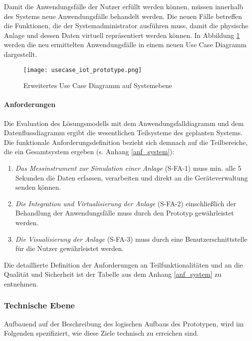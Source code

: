 Damit die Anwendungsfälle der Nutzer erfüllt werden können, müssen innerhalb des Systems neue Anwendungsfälle behandelt werden. Die neuen Fälle betreffen die Funktionen, die der Systemadministrator ausführen muss, damit die physische Anlage und dessen Daten virtuell repräsentiert werden können. In Abbildung \ref{usecasediagram} werden die neu ermittelten Anwendungsfälle in einem neuen Use Case Diagramm dargestellt.

\begin{figure}[ht!]
  \centering
  \texttt{[image: usecase\_iot\_prototype.png]}
  \caption[Erweitertes Use Case Diagramm auf Systemebene]{Erweitertes Use Case Diagramm auf Systemebene}
  \label{usecasediagram}
\end{figure}
\paragraph{Anforderungen}

Die Evaluation des Lösungsmodells mit dem Anwendungsfalldiagramm und dem Datenflussdiagramm ergibt die wesentlichen Teilsysteme des geplanten Systems. Die funktionale Anforderungsdefinition bezieht sich demnach auf die Teilbereiche, die ein Gesamtsystem ergeben (s. Anhang \ref{anf_system}):
\begin{enumerate}
  \item \textit{Das Messinstrument zur Simulation einer Anlage} (S-FA-1) muss min. alle 5 Sekunden die Daten erfassen, verarbeiten und direkt an die Geräteverwaltung senden können.
  \item \textit{Die Integration und Virtualisierung der Anlage} (S-FA-2) einschließlich der Behandlung der Anwendungsfälle muss durch den Prototyp gewährleistet werden.
  \item \textit{Die Visualisierung der Anlage} (S-FA-3) muss durch eine Benutzerschnittstelle für die Nutzer gewährleistet werden.
\end{enumerate}

\noindent Die detaillierte Definition der Anforderungen an Teilfunktionalitäten und an die Qualität und Sicherheit ist der Tabelle aus dem Anhang \ref{anf_system} zu entnehmen.

\subsubsection{Technische Ebene}
Aufbauend auf der Beschreibung des logischen Aufbaus des Prototypen, wird im Folgenden spezifiziert, wie diese Ziele technisch zu erreichen sind.


